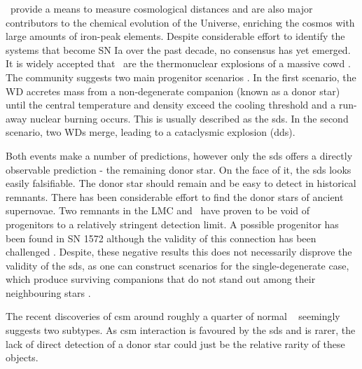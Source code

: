 \documentclass[preprint2]{aastex}
\begin{document}
\sneia\ provide a means to measure cosmological distances and are also major contributors to the chemical evolution of the Universe, enriching the cosmos with large amounts of iron-peak elements. Despite considerable effort to identify the systems that become SN Ia over the past decade, no consensus has yet emerged. It is widely accepted that \sneia\ are the thermonuclear explosions of a massive \gls{cowd} . The community suggests two main progenitor scenarios \cite[for a review see][and references therein]{2012NewAR..56..122W}. In the first scenario, the WD accretes mass from a non-degenerate companion (known as a donor star) until the central temperature and density exceed the cooling threshold and a run-away nuclear burning occurs. This is usually described as the \gls{sds}. In the second scenario, two WDs merge, leading to a cataclysmic explosion (\gls{dds}).

Both events make a number of predictions, however only the \gls{sds} offers a directly observable prediction - the remaining donor star. On the face of it, the \gls{sds} looks easily falsifiable. The donor star should remain \citep[e.g.][]{2000ApJS..128..615M} and be easy to detect in historical remnants. There has been considerable effort \citep{2004Natur.431.1069R, 2009ApJ...691....1G,2009ApJ...701.1665K,2012Natur.481..164S,2012Natur.489..533G,2012arXiv1210.2713K,2012ApJ...759....7K, 2012ApJ...747L..19E} to find the donor stars of ancient supernovae. Two remnants in the LMC and \ have proven to be void of progenitors to a relatively stringent detection limit. A possible progenitor has been found in SN 1572 \citep{2004Natur.431.1069R} although the validity of this connection has been challenged \citep{2012arXiv1210.2713K}. Despite, these negative results this does not necessarily disprove the validity of the \gls{sds}, as one can construct scenarios for the single-degenerate case, which produce surviving companions that do not stand out among their neighbouring stars \citep[e.g.][]{2012ApJ...760...21P, 2013arXiv1303.2691L, 2003astro.ph..3660P}. 

The recent discoveries of \gls{csm} around roughly a quarter of normal \sneia\ \citep{2007Sci...317..924P, 2009ApJ...702.1157S, 2011Sci...333..856S, 2012ApJ...752..101F} seemingly suggests two subtypes. As \gls{csm} interaction is favoured by the \gls{sds} and is rarer, the lack of direct detection of a donor star could just be the relative rarity of these objects.
\end{document}
